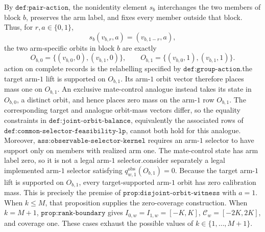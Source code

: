 By \(\texttt{def:pair-action}\), the nonidentity element \(s_b\) interchanges the two members of block \(b\), preserves the arm label, and fixes every member outside that block. Thus, for \(r,a\in\{0,1\}\),\n\[s_b(v_{b,r},a)=(v_{b,1-r},a),\]\nand the two arm-specific orbits in block \(b\) are exactly\n\[O_{b,0}=\{(v_{b,0},0),(v_{b,1},0)\},\qquad O_{b,1}=\{(v_{b,0},1),(v_{b,1},1)\}.\]\nThe action on complete records is the relabelling specified by \(\texttt{def:group-action}\).\n\nSuppose the target arm-\(1\) lift is supported on \(O_{b,1}\). Its arm-\(1\) orbit vector therefore places mass one on \(O_{b,1}\). An exclusive mate-control analogue instead takes its state in \(O_{b,0}\), a distinct orbit, and hence places zero mass on the arm-\(1\) row \(O_{b,1}\). The corresponding target and analogue orbit-mass vectors differ, so the equality constraints in \(\texttt{def:joint-orbit-balance}\), equivalently the associated rows of \(\texttt{def:common-selector-feasibility-lp}\), cannot both hold for this analogue. Moreover, \(\texttt{ass:observable-selector-kernel}\) requires an arm-\(1\) selector to have support only on members with realized arm one. The mate-control state has arm label zero, so it is not a legal arm-\(1\) selector.\n\nNow consider separately a legal implemented arm-\(1\) selector satisfying \(q^{\mathrm{obs}}_{w,1}(O_{b,1})=0\). Because the target arm-\(1\) lift is supported on \(O_{b,1}\), every target-supported arm-\(1\) orbit has zero calibration mass. This is precisely the premise of \(\texttt{prop:disjoint-orbit-witness}\) with \(a=1\). When \(k\le M\), that proposition supplies the zero-coverage construction. When \(k=M+1\), \(\texttt{prop:rank-boundary}\) gives \(I_{0,w}=I_{1,w}=[-K,K]\), \(\mathcal C_w=[-2K,2K]\), and coverage one. These cases exhaust the possible values of \(k\in\{1,\ldots,M+1\}\).